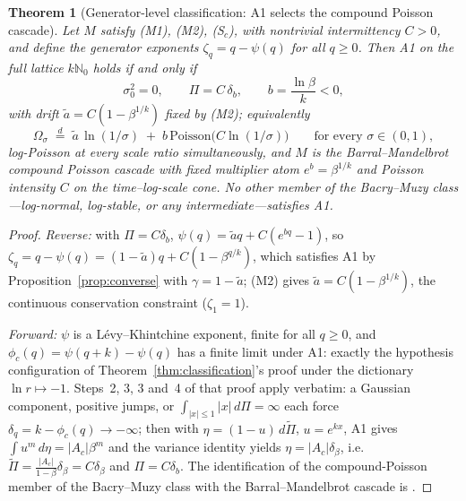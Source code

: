 \documentclass[12pt]{amsart}
\newtheorem{theorem}{Theorem}
\theoremstyle{definition}
\theoremstyle{remark}
\begin{document}
\begin{theorem}[Generator-level classification: A1 selects the
compound Poisson cascade]\label{thm:cpc}
Let $M$ satisfy \textup{(M1)}, \textup{(M2)}, \textup{(S$_c$)}, with
nontrivial intermittency $C > 0$, and define the generator
exponents $\zeta_q = q - \psi(q)$ for all $q \ge 0$.  Then A1 on the
full lattice $k\mathbb{N}_0$ holds if and only if
\[
  \sigma_0^2 = 0, \qquad \Pi = C\,\delta_b, \qquad
  b = \frac{\ln\beta}{k} < 0,
\]
with drift $\tilde a = C(1-\beta^{1/k})$ fixed by \textup{(M2)};
equivalently
\[
  \Omega_\sigma \;\stackrel{d}{=}\;
  \tilde a\,\ln(1/\sigma) \;+\; b\,\mathrm{Poisson}\bigl(C
  \ln(1/\sigma)\bigr)
  \qquad\text{for every } \sigma \in (0,1),
\]
log-Poisson at every scale ratio simultaneously, and $M$ is the
Barral--Mandelbrot compound Poisson cascade \cite{BM02} with fixed
multiplier atom $e^b = \beta^{1/k}$ and Poisson intensity $C$ on the
time--log-scale cone.  No other member of the Bacry--Muzy
class---log-normal, log-stable, or any intermediate---satisfies A1.
\end{theorem}

\begin{proof}
\textit{Reverse:}  with $\Pi = C\delta_b$, $\psi(q) = \tilde aq +
C(e^{bq}-1)$, so $\zeta_q = q - \psi(q) = (1-\tilde a)q +
C(1-\beta^{q/k})$, which satisfies A1 by
Proposition~\ref{prop:converse} with $\gamma = 1 - \tilde a$; (M2)
gives $\tilde a = C(1-\beta^{1/k})$, the continuous conservation
constraint ($\zeta_1 = 1$).

\textit{Forward:}  $\psi$ is a L\'evy--Khintchine exponent, finite
for all $q \ge 0$, and $\phi_c(q) = \psi(q+k)-\psi(q)$ has a finite
limit under A1: exactly the hypothesis configuration of
Theorem~\ref{thm:classification}'s proof under the dictionary
$\ln r \mapsto -1$.  Steps~2, 3, 3\textonehalf{} and~4 of that proof
apply verbatim: a Gaussian component, positive jumps, or
$\int_{|x|\le1}|x|\,d\Pi = \infty$ each force $\delta_q = k -
\phi_c(q) \to -\infty$; then with $\eta = (1-u)\,d\tilde\Pi$,
$u = e^{kx}$, A1 gives $\int u^m\,d\eta = |A_c|\beta^m$ and the
variance identity yields $\eta = |A_c|\delta_\beta$, i.e.\
$\tilde\Pi = \frac{|A_c|}{1-\beta}\delta_\beta = C\delta_\beta$ and
$\Pi = C\delta_b$.  The identification of the compound-Poisson
member of the Bacry--Muzy class with the Barral--Mandelbrot cascade
is \cite{BM03}.
\end{proof}
\end{document}
